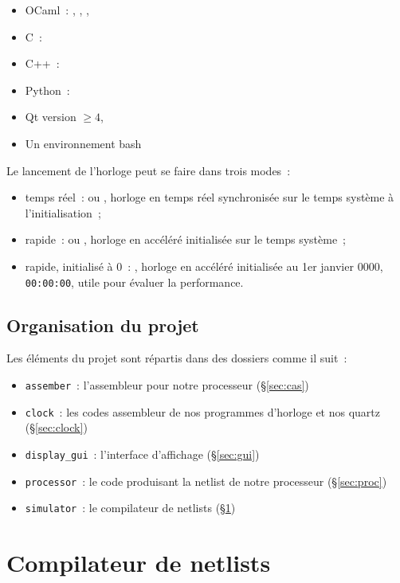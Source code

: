 \documentclass[11pt,a4paper]{article}
\begin{document}
\begin{itemize}
\item OCaml~: , , , 
\item C~: 
\item C++~: 
\item Python~: 
\item Qt version $\geq 4$, 
\item Un environnement bash
\end{itemize}

Le lancement de l'horloge peut se faire dans trois modes~:
\begin{itemize}
\item temps réel~:  ou , horloge en temps réel synchronisée sur le temps système à l'initialisation~;
\item rapide~:  ou , horloge en accéléré initialisée sur le temps système~;
\item rapide, initialisé à 0~: , horloge en accéléré initialisée au 1er janvier 0000, \verb!00:00:00!, utile pour évaluer la performance.
\end{itemize}

\subsection{Organisation du projet}

Les éléments du projet sont répartis dans des dossiers comme il suit~:
\begin{itemize}
\item \texttt{assember}~: l'assembleur pour notre processeur (§\ref{sec:cas})
\item \texttt{clock}~: les codes assembleur de nos programmes d'horloge et nos quartz (§\ref{sec:clock})
\item \texttt{display\_gui}~: l'interface d'affichage (§\ref{sec:gui})
\item \texttt{processor}~: le code produisant la netlist de notre processeur (§\ref{sec:proc})
\item \texttt{simulator}~: le compilateur de netlists (§\ref{sec:compilo})
\end{itemize}

\section{Compilateur de netlists} \label{sec:compilo}
\end{document}

